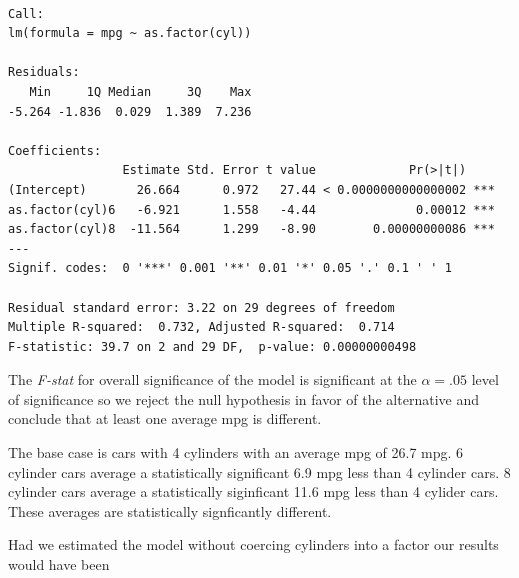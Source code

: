 \documentclass[]{book}
\newenvironment{Shaded}{\begin{snugshade}}{\end{snugshade}}
\newcommand{\KeywordTok}[1]{\textcolor[rgb]{0.13,0.29,0.53}{\textbf{#1}}}
\newcommand{\NormalTok}[1]{#1}
\newcommand{\OperatorTok}[1]{\textcolor[rgb]{0.81,0.36,0.00}{\textbf{#1}}}
\newcommand{\StringTok}[1]{\textcolor[rgb]{0.31,0.60,0.02}{#1}}
\begin{document}
\begin{Shaded}
\end{Shaded}

\begin{verbatim}

Call:
lm(formula = mpg ~ as.factor(cyl))

Residuals:
   Min     1Q Median     3Q    Max 
-5.264 -1.836  0.029  1.389  7.236 

Coefficients:
                Estimate Std. Error t value             Pr(>|t|)    
(Intercept)       26.664      0.972   27.44 < 0.0000000000000002 ***
as.factor(cyl)6   -6.921      1.558   -4.44              0.00012 ***
as.factor(cyl)8  -11.564      1.299   -8.90        0.00000000086 ***
---
Signif. codes:  0 '***' 0.001 '**' 0.01 '*' 0.05 '.' 0.1 ' ' 1

Residual standard error: 3.22 on 29 degrees of freedom
Multiple R-squared:  0.732, Adjusted R-squared:  0.714 
F-statistic: 39.7 on 2 and 29 DF,  p-value: 0.00000000498
\end{verbatim}

The \emph{F-stat} for overall significance of the model is significant at the \(\alpha = .05\) level of significance so we reject the null hypothesis in favor of the alternative and conclude that at least one average mpg is different.

The base case is cars with 4 cylinders with an average mpg of 26.7 mpg. 6 cylinder cars average a statistically significant 6.9 mpg less than 4 cylinder cars. 8 cylinder cars average a statistically siginficant 11.6 mpg less than 4 cylider cars. These averages are statistically signficantly different.

Had we estimated the model without coercing cylinders into a factor our results would have been

\begin{Shaded}
\end{Shaded}
\end{document}
